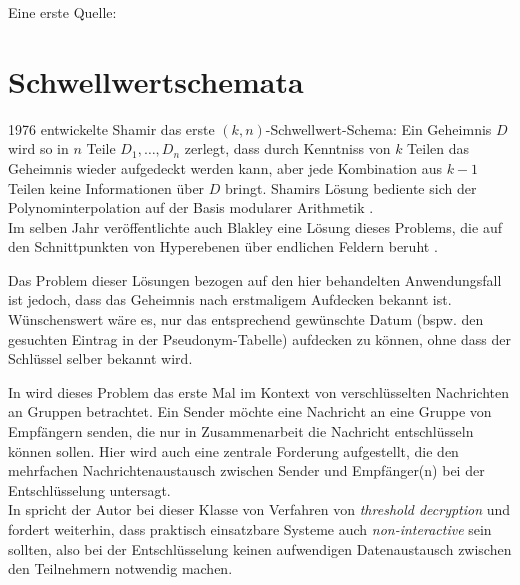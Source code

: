 \documentclass[
    fontsize=12pt,
    headings=small,
    parskip=half,           %
    bibliography=totoc,
    numbers=noenddot,       %
    open=any,               %
    ]{scrreprt}
\begin{document}
\label{sec_pseudonym}


Eine erste Quelle: \cite{pfitzmann2001, pfitzmann2010}


\section{Schwellwertschemata}

\label{sec_threshold}






1976 entwickelte Shamir das erste \((k,n)\)-Schwellwert-Schema: Ein Geheimnis \(D\) wird so in \(n\) Teile \(D_1, \dots, D_n\) zerlegt, dass durch Kenntniss von \(k\) Teilen das Geheimnis wieder aufgedeckt werden kann, aber jede Kombination aus \(k-1\) Teilen keine Informationen über \(D\) bringt. Shamirs Lösung bediente sich der Polynominterpolation auf der Basis modularer Arithmetik \cite{shamir1979}.\\
Im selben Jahr veröffentlichte auch Blakley eine Lösung dieses Problems, die auf den Schnittpunkten von Hyperebenen über endlichen Feldern beruht \cite{blakley1979}.

Das Problem dieser Lösungen bezogen auf den hier behandelten Anwendungsfall ist jedoch, dass das Geheimnis nach erstmaligem Aufdecken bekannt ist. Wünschenswert wäre es, nur das entsprechend gewünschte Datum (bspw. den gesuchten Eintrag in der Pseudonym-Tabelle) aufdecken zu können, ohne dass der Schlüssel selber bekannt wird. 


In \cite{desmedt1987} wird dieses Problem das erste Mal im Kontext von verschlüsselten Nachrichten an Gruppen betrachtet. Ein Sender möchte eine Nachricht an eine Gruppe von Empfängern senden, die nur in Zusammenarbeit die Nachricht entschlüsseln können sollen. Hier wird auch eine zentrale Forderung aufgestellt, die den mehrfachen Nachrichtenaustausch zwischen Sender und Empfänger(n) bei der Entschlüsselung untersagt. \\
In \cite{desmedt1993} spricht der Autor bei dieser Klasse von Verfahren von \textit{threshold decryption} und fordert weiterhin, dass praktisch einsatzbare Systeme auch \textit{non-interactive} sein sollten, also bei der Entschlüsselung keinen aufwendigen Datenaustausch zwischen den Teilnehmern notwendig machen.
\end{document}
